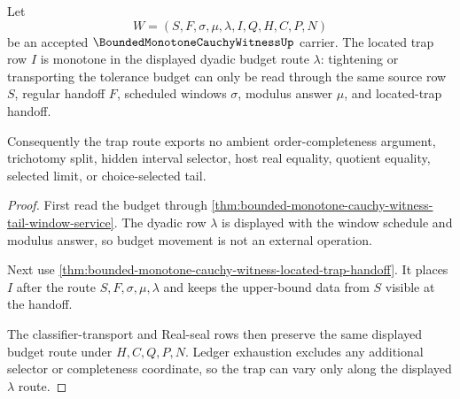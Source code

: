 \begin{theorem}
\label{thm:bounded-monotone-cauchy-witness-trap-budget-monotonicity}
Let
$$
W=(S,F,\sigma,\mu,\lambda,I,Q,H,C,P,N)
$$
be an accepted $\BoundedMonotoneCauchyWitnessUp$ carrier. The located trap row $I$ is monotone in the displayed dyadic budget route $\lambda$: tightening or transporting the tolerance budget can only be read through the same source row $S$, regular handoff $F$, scheduled windows $\sigma$, modulus answer $\mu$, and located-trap handoff.

Consequently the trap route exports no ambient order-completeness argument, trichotomy split, hidden interval selector, host real equality, quotient equality, selected limit, or choice-selected tail.
\end{theorem}
\begin{proof}
First read the budget through \autoref{thm:bounded-monotone-cauchy-witness-tail-window-service}. The dyadic row $\lambda$ is displayed with the window schedule and modulus answer, so budget movement is not an external operation.

Next use \autoref{thm:bounded-monotone-cauchy-witness-located-trap-handoff}. It places $I$ after the route $S,F,\sigma,\mu,\lambda$ and keeps the upper-bound data from $S$ visible at the handoff.

The classifier-transport and Real-seal rows then preserve the same displayed budget route under $H,C,Q,P,N$. Ledger exhaustion excludes any additional selector or completeness coordinate, so the trap can vary only along the displayed $\lambda$ route.
\end{proof}


